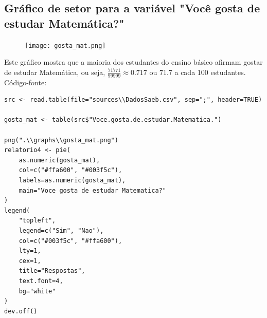 \documentclass[17pt]{extarticle}
\begin{document}
\subsection{Gráfico de setor para a variável "Você gosta de estudar Matemática?"}
\begin{figure}[H]
    \texttt{[image: gosta\_mat.png]}
    \centering
\end{figure}
Este gráfico mostra que a maioria dos estudantes do ensino básico afirmam gostar de estudar Matemática, ou seja, \(\frac{71771}{99999} \approx 0.717\) ou 71.7 a cada 100 estudantes. \newline
Código-fonte:
\begin{lstlisting}
src <- read.table(file="sources\\DadosSaeb.csv", sep=";", header=TRUE)

gosta_mat <- table(src$"Voce.gosta.de.estudar.Matematica.")

png(".\\graphs\\gosta_mat.png")
relatorio4 <- pie(
    as.numeric(gosta_mat),
    col=c("#ffa600", "#003f5c"),
    labels=as.numeric(gosta_mat),
    main="Voce gosta de estudar Matematica?"
)
legend(
    "topleft",
    legend=c("Sim", "Nao"),
    col=c("#003f5c", "#ffa600"),
    lty=1,
    cex=1,
    title="Respostas",
    text.font=4,
    bg="white"
)
dev.off()
\end{lstlisting}
\end{document}
